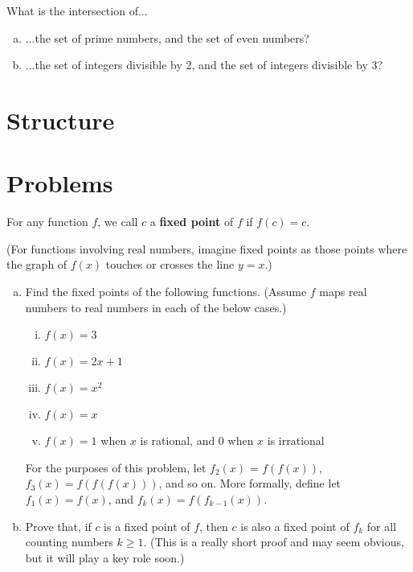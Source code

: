 \begin{exercise}
What is the intersection of...
\begin{enumerate}[(a)]
\item ...the set of prime numbers, and the set of even numbers?
\item ...the set of integers divisible by 2, and the set of integers divisible by 3?
\end{enumerate}
\end{exercise}




\section{Structure}



\section{Problems}


\begin{problem}
\label{pr:fp-intro}
For any function $f$, we call $c$ a \textbf{fixed point} of $f$ if $f(c) = c$. 

(For functions involving real numbers, imagine fixed points as those points where the graph of $f(x)$ touches or crosses the line $y = x$.)


\begin{enumerate}[(a)]
\item Find the fixed points of the following functions. (Assume $f$ maps real numbers to real numbers in each of the below cases.)
\begin{enumerate}[i.]
\item $f(x) = 3$
\item $f(x) = 2x + 1$
\item $f(x) = x^2$
\item $f(x) = x$
\item $f(x) = 1$ when $x$ is rational, and 0 when $x$ is irrational


\end{enumerate}

For the purposes of this problem, let $f_2(x)$ = $f(f(x))$, $f_3(x) = f(f(f(x)))$, and so on. More formally, define let $f_1(x) = f(x)$, and $f_k(x) = f(f_{k-1}(x))$.

\item Prove that, if $c$ is a fixed point of $f$, then $c$ is also a fixed point of $f_k$ for all counting numbers $k \geq 1$. (This is a really short proof and may seem obvious, but it will play a key role soon.)
\end{enumerate}
\end{problem}

